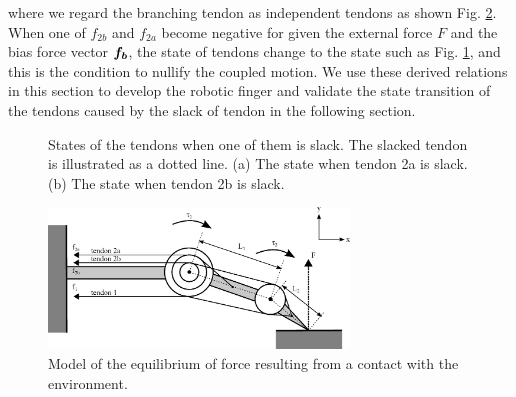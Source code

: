 \documentclass{llncs}
\def\vect#1{\mbox{\boldmath$#1$}}
\begin{document}
where we regard the branching tendon as independent tendons as shown Fig. \ref{external_force}.
When one of $f_{2b}$ and $f_{2a}$ become negative for given the external force $F$ and the bias force vector $\vect{f_{b}}$, the state of tendons change to the state such as Fig. \ref{slacked_tendons}, and this is the condition to nullify the coupled motion.
We use these derived relations in this section to develop the robotic finger and validate the state transition of the tendons caused by the slack of tendon in the following section.

\begin{figure}[t]
	\begin{center}
	\caption{States of the tendons when one of them is slack. The slacked tendon is illustrated as a dotted line. (a) The state when tendon 2a is slack. (b)  The state when tendon 2b is slack.}
	\label{slacked_tendons}
	\end{center}
\end{figure}

\begin{figure}[t]
	\begin{center}
	\includegraphics[width=80mm]{fig/force.eps}
	\end{center}
	\caption{Model of the equilibrium of force resulting from a contact with the environment.}
	\label{external_force}
\end{figure}
\end{document}
